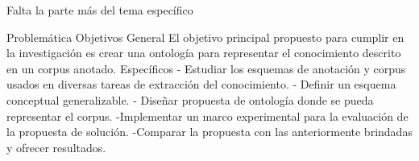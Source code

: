 Falta la parte más del tema específico

Problemática
Objetivos
General
El objetivo principal propuesto para cumplir en la investigación es crear una ontología para representar el conocimiento descrito en un corpus anotado.  
Específicos
- Estudiar los esquemas de anotación y corpus usados en diversas tareas de extracción del conocimiento.
- Definir un esquema conceptual generalizable.
- Diseñar propuesta de ontología donde se pueda representar el corpus.
-Implementar un marco experimental para la evaluación de la propuesta de solución.
-Comparar la propuesta con las anteriormente brindadas y ofrecer resultados.  